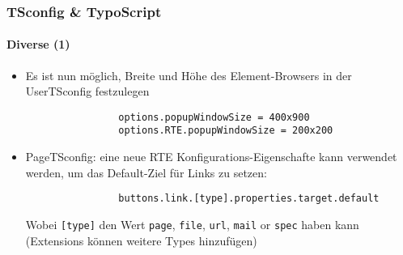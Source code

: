 \begin{frame}[fragile]
	\frametitle{TSconfig \& TypoScript}
	\framesubtitle{Diverse (1)}

	\begin{itemize}
		\item Es ist nun möglich, Breite und Höhe des Element-Browsers in der UserTSconfig festzulegen
		
			\begin{lstlisting}
				options.popupWindowSize = 400x900
				options.RTE.popupWindowSize = 200x200
			\end{lstlisting}
		
		\item PageTSconfig: eine neue RTE Konfigurations-Eigenschafte kann verwendet werden, um das Default-Ziel für Links zu setzen:

			\begin{lstlisting}
				buttons.link.[type].properties.target.default
			\end{lstlisting}

			Wobei \texttt{[type]} den Wert \texttt{page}, \texttt{file}, \texttt{url}, \texttt{mail} or \texttt{spec} haben kann\newline
			(Extensions können weitere Types hinzufügen)
	\end{itemize}

\end{frame}



